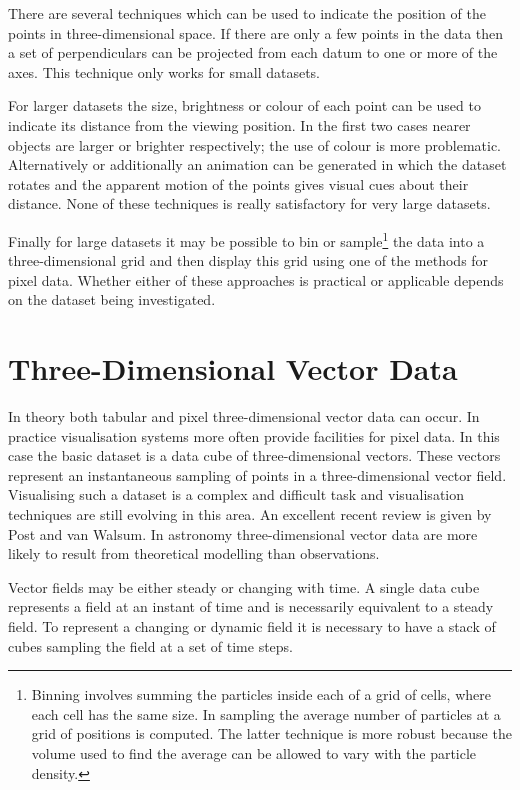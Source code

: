 There are several techniques which can be used to indicate the position
of the points in three-dimensional space. If there are only a few 
points in the data then a set of perpendiculars can be projected from
each datum to one or more of the axes. This technique only works for
small datasets.

For larger datasets the size, brightness or colour of each point can
be used to indicate its distance from the viewing position. In the
first two cases nearer objects are larger or brighter respectively;
the use of colour is more problematic. Alternatively or additionally
an animation can be generated in which the dataset rotates and the
apparent motion of the points gives visual cues about their distance.
None of these techniques is really satisfactory for very large datasets.

\pagebreak
Finally for large datasets it may be possible to bin or
sample\footnote{Binning involves summing the particles inside each of a
grid of cells, where each cell has the same size. In sampling the average
number of particles at a grid of positions is computed. The latter
technique is more robust because the volume used to find the average
can be allowed to vary with the particle density.} the data into a
three-dimensional grid and then display this grid using one of the
methods for pixel data. Whether either of these approaches is practical
or applicable depends on the dataset being investigated.


\section{Three-Dimensional Vector Data
\label{VECTOR3D}  }

In theory both tabular and pixel three-dimensional vector data can
occur. In practice visualisation systems more often provide facilities
for pixel data. In this case the basic dataset is a data cube of 
three-dimensional vectors. These vectors represent an instantaneous 
sampling of points in a three-dimensional vector field. Visualising 
such a dataset is a complex and difficult task and visualisation 
techniques are still evolving in this area. An excellent recent review 
is given by Post and van Walsum\cite{POST}. In astronomy
three-dimensional vector data are more likely to result from theoretical
modelling than observations.

Vector fields may be either steady or changing with time. A single data
cube represents a field at an instant of time and is necessarily
equivalent to a steady field. To represent a changing or dynamic field
it is necessary to have a stack of cubes sampling the field at a set of
time steps.

